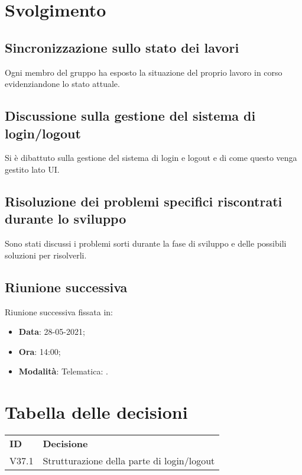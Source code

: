 \documentclass[]{article}
\begin{document}
	\newpage

	\section{Svolgimento}
		\subsection{Sincronizzazione sullo stato dei lavori}
		Ogni membro del gruppo ha esposto la situazione del proprio lavoro in corso evidenziandone lo stato attuale.\\
		
		\subsection{Discussione sulla gestione del sistema di login/logout}
		Si è dibattuto sulla gestione del sistema di login e logout e di come questo venga gestito lato UI. \\
		
		\subsection{Risoluzione dei problemi specifici riscontrati durante lo sviluppo}
		Sono stati discussi i problemi sorti durante la fase di sviluppo e delle possibili soluzioni per risolverli. \\
		
		\subsection{Riunione successiva}
		Riunione successiva fissata in:
		\begin{itemize}
			\item \textbf{Data}: 28-05-2021;
			\item \textbf{Ora}: 14:00;
			\item \textbf{Modalità}: Telematica: .
		\end{itemize}
	
	
\section{Tabella delle decisioni}

\begin{table} [h!]
	\begin{center}
		\begin{tabular} { m{2cm} m{14cm} }
			\rowcolor{lightgray}
			\textbf{ID} & \textbf{Decisione}\\
			V37.1 & Strutturazione della parte di login/logout \glock{Typescript} \\
		\end{tabular}
	\end{center}
\end{table}
\end{document}
